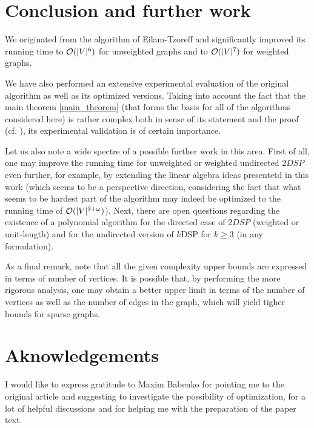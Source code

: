 \section{Conclusion and further work}

We originated from the algorithm of Eilam-Tzoreff and significantly improved its running time to $\mathcal{O}(|V|^6)$ for unweighted graphs and to $\mathcal{O}(|V|^7)$ for weighted graphs. 

We have also performed an extensive experimental evaluation of the original algorithm as well as its optimized versions. Taking into account the fact that the main theorem \ref{main_theorem} (that forms the basis for all of the algorithms considered here) is rather complex both in sense of its statement and the proof (cf. \cite{ET}), its experimental validation is of certain importance.

Let us also note a wide spectre of a possible further work in this area. First of all, one may improve the running time for unweighted or weighted undirected $2DSP$ even further, for example, by extending the linear algebra ideas presentetd  in this work (which seems to be a perspective direction, considering the fact that what seems to be hardest part of the algorithm may indeed be optimized to the running time of $\mathcal{O}(|V|^{3 + \omega})$). Next, there are open questions regarding the existence of a polynomial algorithm for the directed case of $2DSP$ (weighted or unit-length) and for the undirected version of $k$DSP for $k \geq 3$ (in any formulation). 

As a final remark, note that all the given complexity upper bounds are expressed in terms of number of vertices. It is possible that, by performing the more rigorous analysis, one may obtain a better upper limit in terms of the number of vertices as well as the number of edges in the graph, which will yield tigher bounds for sparse graphs. 

\section{Aknowledgements}

I would like to express gratitude to Maxim Babenko for pointing me to the original article \cite{ET} and suggesting to investigate the possibility of optimization, for a lot of helpful discussions and for helping me with the preparation of the paper text.
